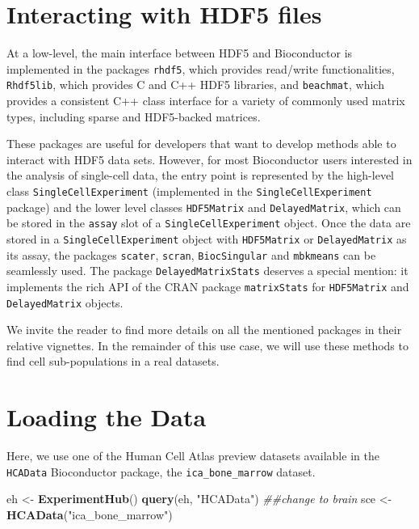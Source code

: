 \documentclass[]{book}
\newenvironment{Shaded}{\begin{snugshade}}{\end{snugshade}}
\newcommand{\CommentTok}[1]{\textcolor[rgb]{0.56,0.35,0.01}{\textit{#1}}}
\newcommand{\KeywordTok}[1]{\textcolor[rgb]{0.13,0.29,0.53}{\textbf{#1}}}
\newcommand{\NormalTok}[1]{#1}
\newcommand{\StringTok}[1]{\textcolor[rgb]{0.31,0.60,0.02}{#1}}
\begin{document}
\hypertarget{interacting-with-hdf5-files}{%
\section{Interacting with HDF5 files}\label{interacting-with-hdf5-files}}

At a low-level, the main interface between HDF5 and Bioconductor is implemented in the packages \texttt{rhdf5}, which provides read/write functionalities, \texttt{Rhdf5lib}, which provides C and C++ HDF5 libraries, and \texttt{beachmat}, which provides a consistent C++ class interface for a variety of commonly used matrix types, including sparse and HDF5-backed matrices.

These packages are useful for developers that want to develop methods able to interact with HDF5 data sets. However, for most Bioconductor users interested in the analysis of single-cell data, the entry point is represented by the high-level class \texttt{SingleCellExperiment} (implemented in the \texttt{SingleCellExperiment} package) and the lower level classes \texttt{HDF5Matrix} and \texttt{DelayedMatrix}, which can be stored in the \texttt{assay} slot of a \texttt{SingleCellExperiment} object. Once the data are stored in a \texttt{SingleCellExperiment} object with \texttt{HDF5Matrix} or \texttt{DelayedMatrix} as its assay, the packages \texttt{scater}, \texttt{scran}, \texttt{BiocSingular} and \texttt{mbkmeans} can be seamlessly used.
The package \texttt{DelayedMatrixStats} deserves a special mention: it implements the rich API of the CRAN package \texttt{matrixStats} for \texttt{HDF5Matrix} and \texttt{DelayedMatrix} objects.

We invite the reader to find more details on all the mentioned packages in their relative vignettes. In the remainder of this use case, we will use these methods to find cell sub-populations in a real datasets.

\hypertarget{loading-the-data}{%
\section{Loading the Data}\label{loading-the-data}}

Here, we use one of the Human Cell Atlas preview datasets available in the \texttt{HCAData} Bioconductor package, the \texttt{ica\_bone\_marrow} dataset.

\begin{Shaded}
\begin{Highlighting}[]
\NormalTok{eh <-}\StringTok{ }\KeywordTok{ExperimentHub}\NormalTok{()}
\KeywordTok{query}\NormalTok{(eh, }\StringTok{"HCAData"}\NormalTok{)}
\CommentTok{##change to brain}
\NormalTok{sce <-}\StringTok{ }\KeywordTok{HCAData}\NormalTok{(}\StringTok{"ica_bone_marrow"}\NormalTok{)}
\end{Highlighting}
\end{Shaded}
\end{document}

